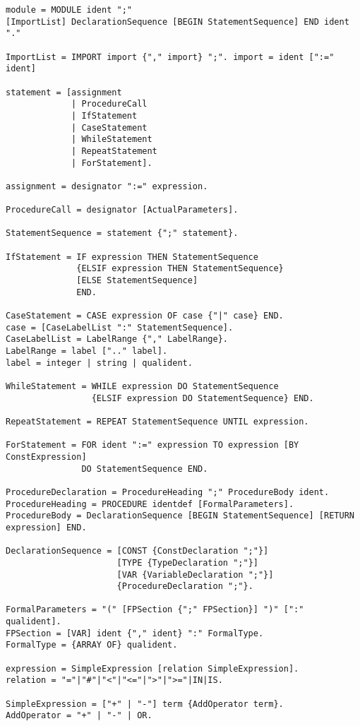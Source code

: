 \documentclass[12pt]{article}
\begin{document}
{\scriptsize
\begin{lstlisting}[style=EBNF]
module = MODULE ident ";" 
[ImportList] DeclarationSequence [BEGIN StatementSequence] END ident "."

ImportList = IMPORT import {"," import} ";". import = ident [":=" ident]

statement = [assignment 
             | ProcedureCall 
             | IfStatement 
             | CaseStatement 
             | WhileStatement 
             | RepeatStatement 
             | ForStatement].

assignment = designator ":=" expression. 

ProcedureCall = designator [ActualParameters]. 

StatementSequence = statement {";" statement}. 

IfStatement = IF expression THEN StatementSequence
              {ELSIF expression THEN StatementSequence} 
              [ELSE StatementSequence] 
              END.

CaseStatement = CASE expression OF case {"|" case} END. 
case = [CaseLabelList ":" StatementSequence]. 
CaseLabelList = LabelRange {"," LabelRange}.
LabelRange = label [".." label].
label = integer | string | qualident.

WhileStatement = WHILE expression DO StatementSequence
                 {ELSIF expression DO StatementSequence} END.

RepeatStatement = REPEAT StatementSequence UNTIL expression. 

ForStatement = FOR ident ":=" expression TO expression [BY ConstExpression]
               DO StatementSequence END.

ProcedureDeclaration = ProcedureHeading ";" ProcedureBody ident. 
ProcedureHeading = PROCEDURE identdef [FormalParameters]. 
ProcedureBody = DeclarationSequence [BEGIN StatementSequence] [RETURN expression] END.

DeclarationSequence = [CONST {ConstDeclaration ";"}]
                      [TYPE {TypeDeclaration ";"}] 
                      [VAR {VariableDeclaration ";"}] 
                      {ProcedureDeclaration ";"}.

FormalParameters = "(" [FPSection {";" FPSection}] ")" [":" qualident]. 
FPSection = [VAR] ident {"," ident} ":" FormalType.
FormalType = {ARRAY OF} qualident.

expression = SimpleExpression [relation SimpleExpression]. 
relation = "="|"#"|"<"|"<="|">"|">="|IN|IS. 

SimpleExpression = ["+" | "-"] term {AddOperator term}. 
AddOperator = "+" | "-" | OR.


\end{lstlisting}}
\end{document}
